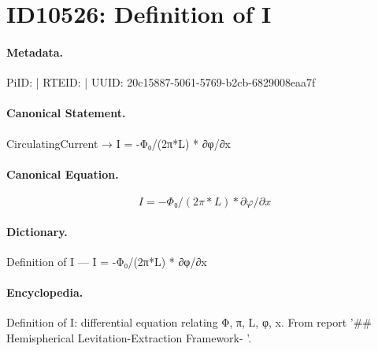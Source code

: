 \section*{ID10526: Definition of I}
\paragraph{Metadata.}
PiID:  | RTEID:  | UUID: 20c15887-5061-5769-b2cb-6829008eaa7f

\paragraph{Canonical Statement.}
CirculatingCurrent → I = -Φ₀/(2π*L) * ∂φ/∂x

\paragraph{Canonical Equation.}
\[
I = -Φ₀/(2π*L) * ∂φ/∂x
\]

\paragraph{Dictionary.}
Definition of I — I = -Φ₀/(2π*L) * ∂φ/∂x

\paragraph{Encyclopedia.}
Definition of I: differential equation relating Φ, π, L, φ, x. From report '\#\# Hemispherical Levitation-Extraction Framework- '.
